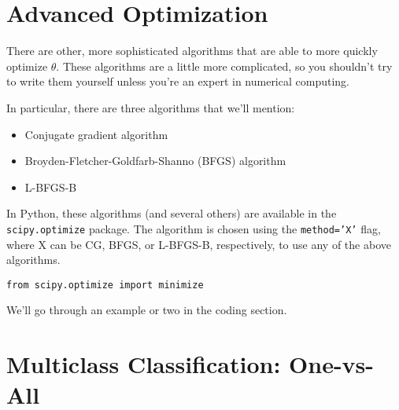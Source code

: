 \section{Advanced Optimization}

There are other, more sophisticated algorithms that are able to more quickly optimize $\theta$. These algorithms are a little more complicated, so you shouldn't try to write them yourself unless you're an expert in numerical computing. 

In particular, there are three algorithms that we'll mention:
\begin{itemize}
\item Conjugate gradient algorithm
\item Broyden-Fletcher-Goldfarb-Shanno (BFGS) algorithm
\item L-BFGS-B
\end{itemize}
In Python, these algorithms (and several others) are available in the {\tt scipy.optimize} package. The algorithm is chosen using the {\tt method='X'} flag, where X can be CG, BFGS, or L-BFGS-B, respectively, to use any of the above algorithms. 
\begin{verbatim}
from scipy.optimize import minimize
\end{verbatim}
We'll go through an example or two in the coding section.



\section{Multiclass Classification: One-vs-All}

